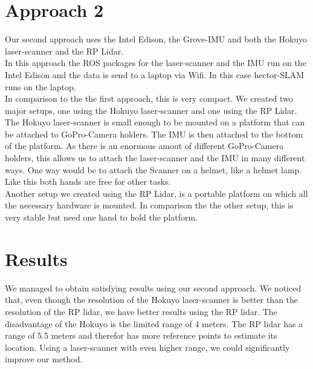 \documentclass{sigchi-ext}
\begin{document}
\section{Approach 2}
Our second approach uses the Intel Edison, the Grove-IMU and both the Hokuyo laser-scanner and the RP Lidar.\\
In this approach the ROS packages for the laser-scanner and the IMU run on the Intel Edison and the data is send to a laptop via Wifi. In this case hector-SLAM runs on the laptop.\\
In comparison to the the first approach, this is very compact.
We created two major setups, one using the Hokuyo laser-scanner and one using the RP Lidar. The Hokuyo laser-scanner is small enough to be mounted on a platform that can be attached to GoPro-Camera holders. The IMU is then attached to the bottom of the platform. As there is an enormous amout of different GoPro-Camera holders, this allows us to attach the laser-scanner and the IMU in many different ways. One way would be to attach the Scanner on a helmet, like a helmet lamp. Like this both hands are free for other tasks.\\
Another setup we created using the RP Lidar, is a portable platform on which all the necessary hardware is mounted. In comparison the the other setup, this is very stable but need one hand to hold the platform.\\
\section{Results}
We managed to obtain satisfying results using our second approach. We noticed that, even though the resolution of the Hokuyo laser-scanner is better than the resolution of the RP lidar, we have better results using the RP lidar. The disadvantage of the Hokuyo is the limited range of 4 meters. The RP lidar has a range of 5.5 meters and therefor has more reference points to estimate its location. Using a laser-scanner with even higher range, we could significantly improve our method.
\balance{} 

%
%
\end{document}
